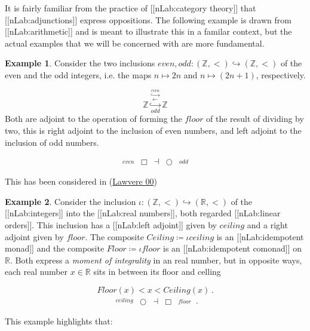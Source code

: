 \documentclass[12pt,titlepage]{article}
\newcommand{\itexarray}[1]{\begin{matrix}#1\end{matrix}}
\newcommand{\lt}{<}
\theoremstyle{plain}
\theoremstyle{definition}
\newtheorem{example}{Example}
\theoremstyle{remark}
\begin{document}
It is fairly familiar from the practice of [[nLab:category theory]] that [[nLab:adjunctions]] express oppositions. The following example is drawn from [[nLab:arithmetic]] and is meant to illustrate this in a familar context, but the actual examples that we will be concerned with are more fundamental.

\begin{example}
\label{}\hypertarget{}{}
Consider the two inclusions $even, odd \colon (\mathbb{Z},\lt ) \hookrightarrow (\mathbb{Z},\lt)$ of the even and the odd integers, i.e. the maps $n \mapsto 2 n$ and $n \mapsto (2n+1)$, respectively.

\begin{displaymath}
\mathbb{Z}
  \stackrel{\overset{even}{\hookrightarrow}}{\stackrel{\longleftarrow}{\underset{odd}{\hookrightarrow}}}
  \mathbb{Z}
\end{displaymath}
Both are adjoint to the operation of forming the $floor$ of the result of dividing by two, this is right adjoint to the inclusion of even numbers, and left adjoint to the inclusion of odd numbers.

\begin{displaymath}
\itexarray{
    \stackrel{even}{} & \Box &\dashv& \bigcirc & \stackrel{odd}{}
  }
\end{displaymath}
\end{example}
This has been considered in (\href{http://ncatlab.org/nlab/show/Aufhebung#Law00}{Lawvere 00})

\begin{example}
\label{}\hypertarget{}{}
Consider the inclusion $\iota \colon (\mathbb{Z}, \lt) \hookrightarrow (\mathbb{R}, \lt)$ of the [[nLab:integers]] into the [[nLab:real numbers]], both regarded [[nLab:linear orders]]. This inclusion has a [[nLab:left adjoint]] given by $ceiling$ and a right adjoint given by $floor$. The composite $Ceiling \coloneqq \iota ceiling$ is an [[nLab:idempotent monad]] and the composite $Floor \coloneqq \iota floor$ is an [[nLab:idempotent comonad]] on $\mathbb{R}$. Both express a \emph{moment of integrality} in an real number, but in opposite ways, each real number $x\in \mathbb{R}$ sits in between its floor and celling

\begin{displaymath}
Floor(x) \lt x \lt Ceiling(x)
  \,.
\end{displaymath}
\begin{displaymath}
\itexarray{
     \stackrel{ceiling}{} &\bigcirc &\dashv& \Box & \stackrel{floor}{}
  }
  \,.
\end{displaymath}
\end{example}
This example highlights that:
\end{document}
